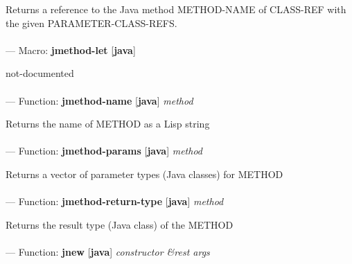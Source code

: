 \begin{adjustwidth}{5em}{5em}
Returns a reference to the Java method METHOD-NAME of CLASS-REF with the given PARAMETER-CLASS-REFS.
\end{adjustwidth}

\paragraph{}
\label{JAVA:JMETHOD-LET}
--- Macro: \textbf{jmethod-let} [\textbf{java}] \textit{}

\begin{adjustwidth}{5em}{5em}
not-documented
\end{adjustwidth}

\paragraph{}
\label{JAVA:JMETHOD-NAME}
--- Function: \textbf{jmethod-name} [\textbf{java}] \textit{method}

\begin{adjustwidth}{5em}{5em}
Returns the name of METHOD as a Lisp string
\end{adjustwidth}

\paragraph{}
\label{JAVA:JMETHOD-PARAMS}
--- Function: \textbf{jmethod-params} [\textbf{java}] \textit{method}

\begin{adjustwidth}{5em}{5em}
Returns a vector of parameter types (Java classes) for METHOD
\end{adjustwidth}

\paragraph{}
\label{JAVA:JMETHOD-RETURN-TYPE}
--- Function: \textbf{jmethod-return-type} [\textbf{java}] \textit{method}

\begin{adjustwidth}{5em}{5em}
Returns the result type (Java class) of the METHOD
\end{adjustwidth}

\paragraph{}
\label{JAVA:JNEW}
--- Function: \textbf{jnew} [\textbf{java}] \textit{constructor \&rest args}

